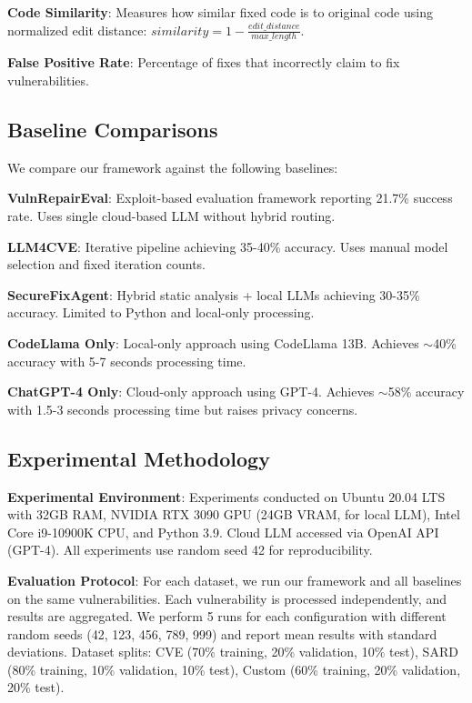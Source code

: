 \documentclass[conference]{IEEEtran}
\begin{document}
\textbf{Code Similarity}: Measures how similar fixed code is to original code using normalized edit distance: $similarity = 1 - \frac{edit\_distance}{max\_length}$.

\textbf{False Positive Rate}: Percentage of fixes that incorrectly claim to fix vulnerabilities.

\subsection{Baseline Comparisons}

We compare our framework against the following baselines:

\textbf{VulnRepairEval}: Exploit-based evaluation framework reporting 21.7\% success rate. Uses single cloud-based LLM without hybrid routing.

\textbf{LLM4CVE}: Iterative pipeline achieving 35-40\% accuracy. Uses manual model selection and fixed iteration counts.

\textbf{SecureFixAgent}: Hybrid static analysis + local LLMs achieving 30-35\% accuracy. Limited to Python and local-only processing.

\textbf{CodeLlama Only}: Local-only approach using CodeLlama 13B. Achieves $\sim$40\% accuracy with 5-7 seconds processing time.

\textbf{ChatGPT-4 Only}: Cloud-only approach using GPT-4. Achieves $\sim$58\% accuracy with 1.5-3 seconds processing time but raises privacy concerns.

\subsection{Experimental Methodology}

\textbf{Experimental Environment}: Experiments conducted on Ubuntu 20.04 LTS with 32GB RAM, NVIDIA RTX 3090 GPU (24GB VRAM, for local LLM), Intel Core i9-10900K CPU, and Python 3.9. Cloud LLM accessed via OpenAI API (GPT-4). All experiments use random seed 42 for reproducibility.

\textbf{Evaluation Protocol}: For each dataset, we run our framework and all baselines on the same vulnerabilities. Each vulnerability is processed independently, and results are aggregated. We perform 5 runs for each configuration with different random seeds (42, 123, 456, 789, 999) and report mean results with standard deviations. Dataset splits: CVE (70\% training, 20\% validation, 10\% test), SARD (80\% training, 10\% validation, 10\% test), Custom (60\% training, 20\% validation, 20\% test).
\end{document}

